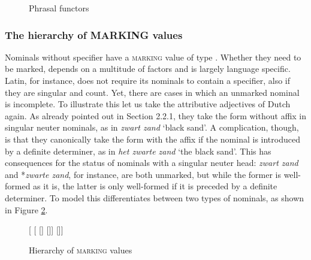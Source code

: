 \documentclass[output=paper
                ,modfonts
                ,nonflat
	        ,collection
	        ,collectionchapter
	        ,collectiontoclongg
 	        ,biblatex
                ,babelshorthands
                ,newtxmath
                ,draftmode
                ,colorlinks, citecolor=brown
]{./langsci/langscibook}
\begin{document}
\begin{figure}
	\centering
{}
	\caption{\label{glorie} Phrasal functors }
\end{figure}


\subsubsection{The hierarchy of MARKING values} 
\label{sec-without-spec}

Nominals without specifier have a \textsc{marking} value of type . 
Whether they need to be marked, depends on a multitude of factors and is 
largely language specific. 
Latin, for instance, does not require its nominals to contain a specifier, also 
if they are singular and count. Yet, there are cases in which an unmarked nominal 
is incomplete.    
To illustrate this let us take the attributive adjectives of Dutch again. 
As already pointed out in Section 2.2.1, they take the form without affix in  
singular neuter nominals, as in \emph{zwart zand} `black sand'. A complication, 
though, is that they canonically take the form with the affix if the nominal is  
introduced by a definite determiner, as in \emph{het zwarte zand} `the black sand'. 
This has consequences for the status of nominals with a singular neuter head: 
\emph{zwart zand} and *\emph{zwarte zand}, for instance, are both unmarked, 
but while the former is well-formed as it is, the latter is only 
well-formed if it is preceded by a definite determiner. 
To model this \citet{VanEynde06} differentiates between two types 
of  nominals, as shown in Figure \ref{bare}. 

\begin{figure}
	\centering
	\begin{forest}
[
	[
		[]
		[]]
	[]]		
	\end{forest}
	\caption{\label{bare} Hierarchy of \textsc{marking} values} 
\end{figure}
\end{document}
